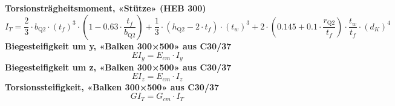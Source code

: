 \documentclass[11pt,a4paper]{article}
\begin{document}
\noindent\textbf{Torsionsträgheitsmoment, «Stütze» (HEB 300)}
\begin{equation*}
I_{T} = \frac{2}{3} \cdot b_{\text{Q2}} \cdot \left(t_{f}\right)^{3} \cdot \left(1 - 0.63 \cdot \frac{t_{f}}{b_{\text{Q2}}}\right) + \frac{1}{3} \cdot \left(h_{\text{Q2}} - 2 \cdot t_{f}\right) \cdot \left(t_{w}\right)^{3} + 2 \cdot \left(0.145 + 0.1 \cdot \frac{r_{\text{Q2}}}{t_{f}}\right) \cdot \frac{t_{w}}{t_{f}} \cdot \left(d_{K}\right)^{4}
\end{equation*}
\noindent\textbf{Biegesteifigkeit um y, «Balken 300×500» aus C30/37}
\begin{equation*}
EI_{y} = E_{cm} \cdot I_{y}
\end{equation*}
\noindent\textbf{Biegesteifigkeit um z, «Balken 300×500» aus C30/37}
\begin{equation*}
EI_{z} = E_{cm} \cdot I_{z}
\end{equation*}
\noindent\textbf{Torsionssteifigkeit, «Balken 300×500» aus C30/37}
\begin{equation*}
GI_{T} = G_{cm} \cdot I_{T}
\end{equation*}
\end{document}
